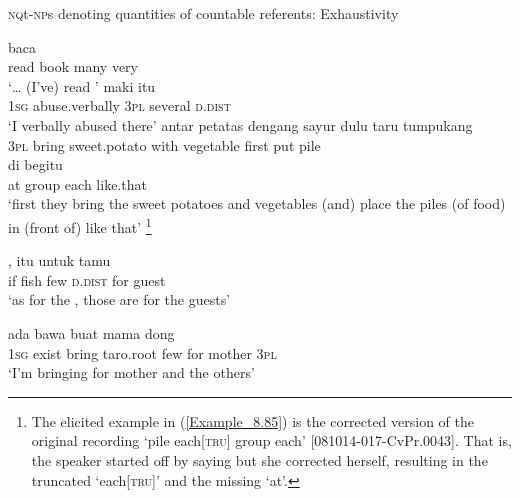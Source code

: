 \begin{styleExampleTitle}
\textsc{nq}t\textsc{{}-np}s denoting  quantities of countable referents: Exhaustivity
\end{styleExampleTitle}
\ea
\label{Example_8.83}
\gll {\ldots} {baca} {} {} {}\\ %
  { }  read  book  many  very\\
\glt 
‘{\ldots} (I’ve) read ’ \textstyleExampleSource{[080917-010-CvEx.0172]}
\z
\ea
\label{Example_8.84}
 {maki} {} {} {itu}\\ %
 \textsc{1sg}  abuse.verbally  \textsc{3pl}  several  \textsc{d.dist}\\
\glt 
‘I verbally abused  there’ \textstyleExampleSource{[080923-008-Cv.0012]}
\z
\ea
\label{Example_8.85}
 {antar} {{petatas}} {{dengang}} {sayur} {dulu} {taru} {tumpukang}\\ %
 {\textsc{3pl}}  bring  {sweet.potato}  {with}  vegetable  first  put  pile\\
\gll di  {}  {}  {begitu}\\
 at  {group}  {each}  {like.that}\\
\glt 
‘first they bring the sweet potatoes and vegetables (and) place the piles (of food) in (front of)  like that’ \textstyleExampleSource{[Elicited BR111021.001]}\footnote{The elicited example in (\ref{Example_8.85}) is the corrected version of the original recording  ‘pile each[\textsc{tru}] group each’ [081014-017-CvPr.0043]. That is, the speaker started off by saying  but she corrected herself, resulting in the truncated   ‘each[\textsc{tru}]’ and the missing    ‘at’.}
\z

\ea
\label{Example_8.86}
 {} {,} {itu} {untuk} {tamu}\\ %
 if  fish  few  \textsc{d.dist}  for  guest\\
\glt 
‘as for the , those are for the guests’ \textstyleExampleSource{[081014-011-CvEx.0008]}
\z

\ea
\label{Example_8.87}
 {ada} {bawa} {} {} {buat} {mama} {dong}\\ %
 \textsc{1sg}  exist  bring  taro.root  few  for  mother  \textsc{3pl}\\
\glt 
‘I’m bringing  for mother and the others’ \textstyleExampleSource{[Elicited }\textstyleExampleSource{]}
\z

